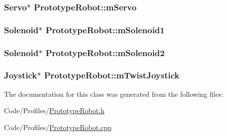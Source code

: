 \hypertarget{class_prototype_robot_aa4594d0971bd4533ff0eb4e03a691819}{
\subsubsection[{m\-Servo}]{\setlength{\rightskip}{0pt plus 5cm}\-Servo$\ast$ {\bf \-Prototype\-Robot\-::m\-Servo}}}\label{class_prototype_robot_aa4594d0971bd4533ff0eb4e03a691819}
\hypertarget{class_prototype_robot_a796da143a2bb4f066d02a917e07b51cb}{
\subsubsection[{m\-Solenoid1}]{\setlength{\rightskip}{0pt plus 5cm}\-Solenoid$\ast$ {\bf \-Prototype\-Robot\-::m\-Solenoid1}}}\label{class_prototype_robot_a796da143a2bb4f066d02a917e07b51cb}
\hypertarget{class_prototype_robot_a09a513e0fc667b2b63156caece8dcab0}{
\subsubsection[{m\-Solenoid2}]{\setlength{\rightskip}{0pt plus 5cm}\-Solenoid$\ast$ {\bf \-Prototype\-Robot\-::m\-Solenoid2}}}\label{class_prototype_robot_a09a513e0fc667b2b63156caece8dcab0}
\hypertarget{class_prototype_robot_a34901bc0b6099bf65cb29ab819487a4b}{
\subsubsection[{m\-Twist\-Joystick}]{\setlength{\rightskip}{0pt plus 5cm}\-Joystick$\ast$ {\bf \-Prototype\-Robot\-::m\-Twist\-Joystick}}}\label{class_prototype_robot_a34901bc0b6099bf65cb29ab819487a4b}


\-The documentation for this class was generated from the following files\-:\begin{DoxyCompactItemize}
\item 
\-Code/\-Profiles/\hyperlink{_prototype_robot_8h}{\-Prototype\-Robot.\-h}\item 
\-Code/\-Profiles/\hyperlink{_prototype_robot_8cpp}{\-Prototype\-Robot.\-cpp}\end{DoxyCompactItemize}
